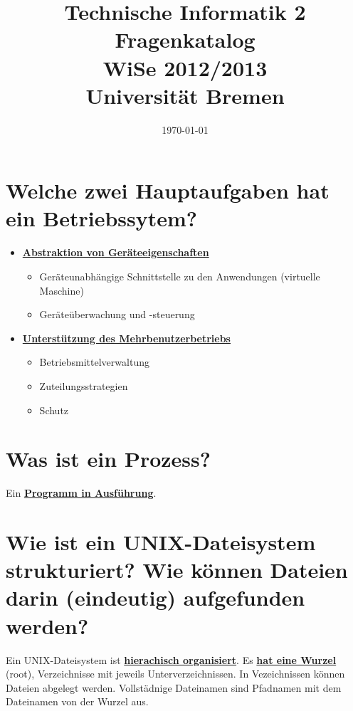 \documentclass[12pt,a4paper,ngerman]{scrartcl}
\title{Technische Informatik 2 \\ Fragenkatalog \\ WiSe 2012/2013 \\[5pt] \Large{Universität Bremen}}
\date{\today}
\newcommand{\crucial}[1]{\textbf{\textcolor{crucial}{\uline{#1}}}}
\newcommand{\question}[1]{#1}
\newenvironment {answer}
                {}
                {}
\begin{document}
\maketitle


\section{\question{Welche zwei Hauptaufgaben hat ein Betriebssytem?}}

\begin{answer}
    \begin{itemize}
    \item \crucial{Abstraktion von Geräteeigenschaften}
        \begin{itemize}
            \item Geräteunabhängige Schnittstelle zu den Anwendungen (virtuelle Maschine)
            \item Geräteüberwachung und -steuerung
        \end{itemize}
    
    \item \crucial{Unterstützung des Mehrbenutzerbetriebs}
        \begin{itemize}
            \item Betriebsmittelverwaltung
            \item Zuteilungsstrategien
            \item Schutz
        \end{itemize}
    \end{itemize}
\end{answer}

\section{\question{Was ist ein Prozess?}}
\begin{answer}
Ein \crucial{Programm in Ausführung}.
\end{answer}

\section{\question{Wie ist ein UNIX-Dateisystem strukturiert? Wie können Dateien darin (eindeutig) aufgefunden
werden?}}
\begin{answer}
Ein UNIX-Dateisystem ist \crucial{hierachisch organisiert}. Es \crucial{hat eine Wurzel} (root), Verzeichnisse
mit jeweils Unterverzeichnissen. In Vezeichnissen können Dateien abgelegt werden.
Vollstädnige Dateinamen sind Pfadnamen mit dem Dateinamen von der Wurzel aus.
\end{answer}
\end{document}
